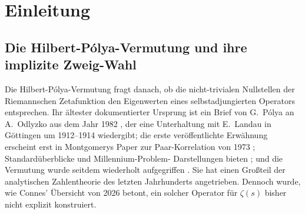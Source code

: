 \documentclass[11pt]{article}
\theoremstyle{definition}
\theoremstyle{remark}
\begin{document}
\clearpage
\tableofcontents
\clearpage

\section{Einleitung}
\label{sec:intro}

\subsection{Die Hilbert-P\'olya-Vermutung und ihre implizite Zweig-Wahl}
\label{sec:hp-implicit-branch}

Die Hilbert-P\'olya-Vermutung fragt danach, ob die nicht-trivialen Nullstellen der
Riemannschen Zetafunktion den Eigenwerten eines selbstadjungierten Operators
entsprechen. Ihr ältester dokumentierter Ursprung ist ein Brief von G.~P\'olya
an A.~Odlyzko aus dem Jahr 1982 \cite{Polya1982letter}, der eine Unterhaltung
mit E.~Landau in Göttingen um 1912--1914 wiedergibt; die erste
veröffentlichte Erwähnung erscheint erst in Montgomerys Paper zur Paar-Korrelation
von 1973 \cite{Montgomery1973}; Standardüberblicke und Millennium-Problem-
Darstellungen bieten \cite{Bombieri2000,Conrey2003}; und die Vermutung wurde
seitdem wiederholt aufgegriffen
\cite{Berry1985, BerryKeating1999, KeatingSnaith2000, Connes1999}. Sie
hat einen Großteil der analytischen Zahlentheorie des letzten Jahrhunderts
angetrieben. Dennoch wurde, wie Connes' Übersicht von 2026 \cite{Connes2026}
betont, ein solcher Operator für $\zeta(s)$ bisher nicht explizit konstruiert.
\end{document}
